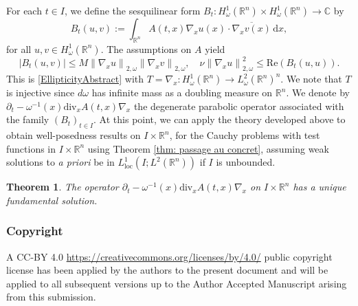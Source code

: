 \documentclass[11pt, letterpaper]{amsart}
\newtheorem{thm}{Theorem}[section]
\theoremstyle{definition}
\theoremstyle{remark}
\numberwithin{equation}{section}
\begin{document}
For each $t \in I$, we define the sesquilinear form $B_t : H^1_\omega(\mathbb{R}^n) \times H^1_\omega(\mathbb{R}^n) \to \mathbb{C}$ by
$$
B_t(u,v) := \int_{\mathbb{R}^n}  A(t,x) \nabla_x u(x) \cdot \overline{\nabla_x v(x)} \, \mathrm{d}x,
$$
for all $u, v \in H^1_\omega(\mathbb{R}^n)$. The assumptions on $A$ yield 
$$
|B_t(u,v)| \leq M \left\| \nabla_x u \right\|_{2,\omega} \left\| \nabla_x v \right\|_{2,\omega}, \quad \nu \left\| \nabla_x u \right\|_{2,\omega}^2 \leq \mathrm{Re}(B_t(u,u)).
$$
This is \eqref{EllipticityAbstract} with $T=\nabla_x : H^1_\omega(\mathbb{R}^n) \to L^2_\omega(\mathbb{R}^n)^n$.
We note that $T$ is injective since $d\omega$ has infinite mass as a doubling measure on $\mathbb{R}^n$. We denote by $\partial_t - \omega^{-1}(x) \mathrm{div}_x A(t,x) \nabla_x$ the degenerate parabolic operator associated with the family $(B_t)_{t \in I}$.
At this point, we can apply the theory developed above to obtain well-posedness results on $I \times \mathbb{R}^n$, for the Cauchy problems with test functions in $I\times \mathbb{R}^n$ using Theorem \ref{thm: passage au concret}, assuming weak solutions to \textit{a priori} be   in $L^1_{\mathrm{loc}}(I; L^2(\mathbb{R}^n))$ if $I$ is unbounded.

\begin{thm}
The operator $\partial_t - \omega^{-1}(x) \mathrm{div}_x A(t,x) \nabla_x$  on $I \times \mathbb{R}^n$ has a unique fundamental solution.
\end{thm}











\subsubsection*{\textbf{Copyright}}
A CC-BY 4.0 \url{https://creativecommons.org/licenses/by/4.0/} public copyright license has been applied by the authors to the present document and will be applied to all subsequent versions up to the Author Accepted Manuscript arising from this submission.




\end{document}
